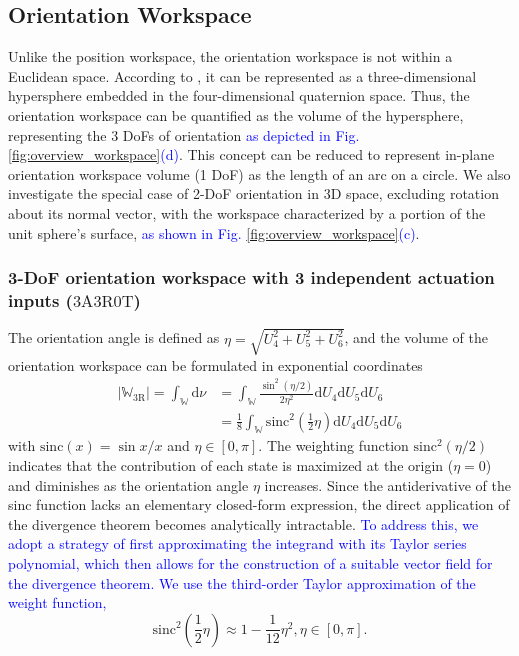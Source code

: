 \documentclass[journal]{IEEEtran}
\theoremstyle{definition}
\begin{document}
\subsection{Orientation Workspace}
\label{sec:workspace:orientation}
Unlike the position workspace, the orientation workspace is not within a Euclidean space. According to \cite{Chen_Jackson_2011}, it can be represented as a three-dimensional hypersphere embedded in the four-dimensional quaternion space. Thus, the orientation workspace can be quantified as the volume of the hypersphere, representing the 3 DoFs of orientation \textcolor{blue}{as depicted in Fig. \ref{fig:overview_workspace}(d)}. This concept can be reduced to represent in-plane orientation workspace volume (1 DoF) as the length of an arc on a circle. We also investigate the special case of 2-DoF orientation in 3D space, excluding rotation about its normal vector, with the workspace characterized by a portion of the unit sphere's surface, \textcolor{blue}{as shown in Fig. \ref{fig:overview_workspace}(c)}.

\subsubsection{3-DoF orientation workspace with 3 independent actuation inputs ($3\text{A}3\text{R}0\text{T}$)} The orientation angle is defined as \(\eta = \sqrt{U_4^2 + U_5^2 + U_6^2}\), and the volume of the orientation workspace can be formulated in exponential coordinates \cite{Chen_Jackson_2011}
\begin{equation}
\begin{split}
    \left|\mathbb{W}_\text{3R}\right| =\int_\mathbb{W}  \mathrm{d}\nu& = \int_\mathbb{W} \frac{\sin^2{\left(\eta/2\right)}}{2\eta^2}\mathrm{d}U_4\mathrm{d}U_5\mathrm{d}U_6 \\
    &= \frac{1}{8}\int_\mathbb{W} \text{sinc}^2 \left(\frac{1}{2}\eta\right) \mathrm{d}U_4\mathrm{d}U_5\mathrm{d}U_6 
\end{split}
\label{eq:orientation_workspace_3d_origin}
\end{equation}
with $\mathrm{sinc}{(x)}=\sin x / x$ and $\eta \in \left[0, \pi\right]$. The weighting function $\text{sinc}^2(\eta/2)$ indicates that the contribution of each state is maximized at the origin ($\eta=0$) and diminishes as the orientation angle $\eta$ increases. Since the antiderivative of the sinc function lacks an elementary closed-form expression, the direct application of the divergence theorem becomes analytically intractable. \textcolor{blue}{To address this, we adopt a strategy of first approximating the integrand with its Taylor series polynomial, which then allows for the construction of a suitable vector field for the divergence theorem. We use the third-order Taylor approximation of the weight function,}
\begin{equation}
    \text{sinc}^2 \left(\frac{1}{2}\eta\right) \approx 1 - \frac{1}{12} \eta^2, \eta\in\left[0, \pi\right].
\end{equation}
\end{document}
